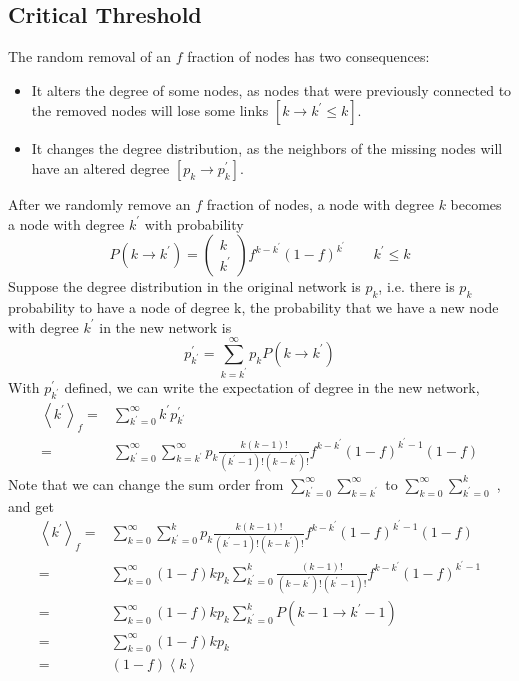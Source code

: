 \documentclass[11pt]{article}
\newcommand{\expbracket}[1]{\left \langle #1  \right \rangle}
\begin{document}
\subsection{Critical Threshold}
The random removal of an $f$ fraction of nodes has two consequences:
\begin{itemize}
    \item It alters the degree of some nodes, as nodes that were previously connected to the removed nodes will lose some links $[k \rightarrow k^{\prime} \le k]$.
    \item It changes the degree distribution, as the neighbors of the missing nodes will have an altered degree $[p_k \rightarrow  p^{\prime}_k]$.
\end{itemize}
After we randomly remove an $f$ fraction of nodes, a node with degree $k$ becomes a node with degree $k^\prime$ with probability 
\begin{equation}
    	P(k \rightarrow k^\prime) = 
    	\left(\begin{array}{ll} 
    	    k \\
    	    k^\prime
    	\end{array} \right) f^{k - k^\prime} (1-f)^{k^\prime} \qquad k^\prime \le k
\end{equation}
Suppose the degree distribution in the original network is $p_k$, i.e. there is $p_k$ probability to have a node of degree k, the probability that we have a new node with degree $k^\prime$ in the new network is 
\begin{equation}
    p^\prime_{k^\prime} = \sum_{k=k^\prime}^{\infty} p_k P(k \rightarrow k^\prime)
\end{equation}
With $p^\prime_{k^\prime}$ defined, we can write the expectation of degree in the new network,
\begin{equation}
    \begin{split}
        \expbracket{k^\prime}_f  = & \sum_{k^\prime=0}^{\infty} k^\prime p^\prime_{k^\prime} \\
        = & \sum_{k^\prime=0}^{\infty} \sum_{k=k^\prime}^{\infty} p_k \frac{k(k-1)!}{(k^\prime-1)!(k-k^\prime)!}f^{k-k^\prime}(1-f)^{k^\prime-1}(1-f)
    \end{split}
\end{equation}
Note that we can change the sum order from $\sum_{k^\prime=0}^{\infty} \sum_{k=k^\prime}^{\infty}$ to $\sum_{k=0}^{\infty}  \sum_{k^\prime=0}^{k}$ , and get
\begin{equation}
    \begin{split}
        \expbracket{k^\prime}_f  = & \sum_{k=0}^{\infty}  \sum_{k^\prime=0}^{k} p_k \frac{k(k-1)!}{(k^\prime-1)!(k-k^\prime)!}f^{k-k^\prime}(1-f)^{k^\prime-1}(1-f) \\
         = & \sum_{k=0}^{\infty} (1-f) k p_k \sum_{k^\prime=0}^{k} \frac{(k-1)!}{(k-k^\prime)!(k^\prime-1)!}f^{k-k^\prime}(1-f)^{k^\prime-1}  \\
         = & \sum_{k=0}^{\infty} (1-f) k p_k \sum_{k^\prime=0}^{k} P(k-1 \rightarrow k^\prime -1) \\
         = & \sum_{k=0}^{\infty} (1-f) k p_k \\
         = & (1-f) \expbracket{k}
    \end{split}
\end{equation}
\end{document}
